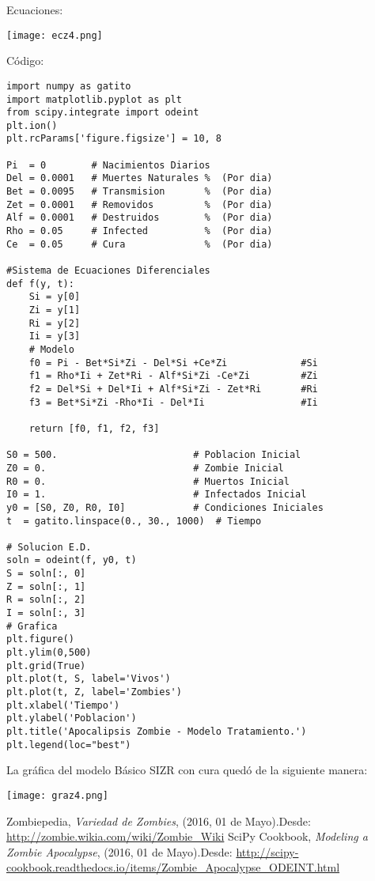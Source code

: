 \documentclass[12pt,letterpaper]{article}
\begin{document}
Ecuaciones: 

\begin{center}
\texttt{[image: ecz4.png]}
\end{center}

C\'odigo:
\begin{verbatim}
import numpy as gatito
import matplotlib.pyplot as plt
from scipy.integrate import odeint
plt.ion()
plt.rcParams['figure.figsize'] = 10, 8

Pi  = 0        # Nacimientos Diarios
Del = 0.0001   # Muertes Naturales %  (Por dia)
Bet = 0.0095   # Transmision       %  (Por dia)
Zet = 0.0001   # Removidos         %  (Por dia)
Alf = 0.0001   # Destruidos        %  (Por dia)
Rho = 0.05     # Infected          %  (Por dia)
Ce  = 0.05     # Cura              %  (Por dia)

#Sistema de Ecuaciones Diferenciales 
def f(y, t):
    Si = y[0]
    Zi = y[1]
    Ri = y[2]
    Ii = y[3]
    # Modelo
    f0 = Pi - Bet*Si*Zi - Del*Si +Ce*Zi             #Si
    f1 = Rho*Ii + Zet*Ri - Alf*Si*Zi -Ce*Zi         #Zi
    f2 = Del*Si + Del*Ii + Alf*Si*Zi - Zet*Ri       #Ri
    f3 = Bet*Si*Zi -Rho*Ii - Del*Ii                 #Ii
    
    return [f0, f1, f2, f3]

S0 = 500.                        # Poblacion Inicial
Z0 = 0.                          # Zombie Inicial
R0 = 0.                          # Muertos Inicial
I0 = 1.                          # Infectados Inicial
y0 = [S0, Z0, R0, I0]            # Condiciones Iniciales
t  = gatito.linspace(0., 30., 1000)  # Tiempo

# Solucion E.D.
soln = odeint(f, y0, t)
S = soln[:, 0]
Z = soln[:, 1]
R = soln[:, 2]
I = soln[:, 3]
# Grafica
plt.figure()
plt.ylim(0,500)
plt.grid(True)
plt.plot(t, S, label='Vivos')
plt.plot(t, Z, label='Zombies')
plt.xlabel('Tiempo')
plt.ylabel('Poblacion')
plt.title('Apocalipsis Zombie - Modelo Tratamiento.')
plt.legend(loc="best")
\end{verbatim}

\newpage
La gr\'afica del modelo B\'asico SIZR con cura qued\'o de la siguiente manera:

\begin{center}
\texttt{[image: graz4.png]} 
\end{center}





\begin{thebibliography}{widestlabel}
       Zombiepedia, \emph{Variedad de Zombies}, (2016, 01 de Mayo).Desde: \url{http://zombie.wikia.com/wiki/Zombie_Wiki}
       SciPy Cookbook, \emph{Modeling a Zombie Apocalypse}, (2016, 01 de Mayo).Desde: \url{http://scipy-cookbook.readthedocs.io/items/Zombie_Apocalypse_ODEINT.html}
\end{thebibliography}
\end{document}
